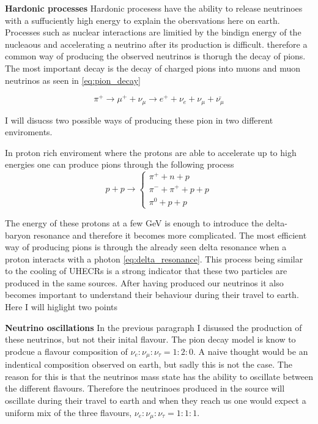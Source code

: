 \documentclass{article}
\begin{document}
\textbf{Hardonic processes}
Hardonic procesess have the ability to release neutrinoes with a suffuciently high energy to explain the obersvations here on earth. 
Processes such as nuclear interactions are limitied by the bindign energy of the nucleaous and accelerating a neutrino after its production is difficult.
therefore a common way of producing the observed neutrinos is thorugh the decay of pions. The most important decay is the decay of charged pions into muons and muon neutrinos as seen in \ref{eq:pion_decay}


\begin{equation}
    \pi^+ \rightarrow \mu^+ + \nu_\mu \rightarrow e^+ + \nu_e + \nu_\mu + \bar{\nu_\mu}
    \label{eq:pion_decay}
\end{equation}

I will disucss two possible ways of producing these pion in two different enviroments. 


In proton rich enviroment where the protons are able to accelerate up to high energies one can produce pions through the following process
\begin{equation}
    p + p \rightarrow \begin{cases}
        \pi^+ + n+ p \\
        \pi^- + \pi^+ +p + p  \\
        \pi^0 + p+p
    \end{cases}
\end{equation}

The energy of these protons at a few GeV is enough to introduce the delta-baryon resonance and therefore it becomes more complicated.
The most efficient way of producing pions is through the already seen delta resonance when a proton interacts with a photon \ref{eq:delta_resonance}.
This process being similar to the cooling of UHECRs is a strong indicator that these two particles are produced in the same sources. 
After having produced our neutrinos it also becomes important to understand their behaviour during their travel to earth. Here I will higlight two points


\textbf{Neutrino oscillations}
In the previous paragraph I disussed the production of these neutrinos, but not their inital flavour.
The pion decay model is know to prodcue a flavour composition of $\nu_e : \nu_\mu : \nu_\tau = 1:2:0$. 
A naive thought would be an indentical composition observed on earth, but sadly this is not the case. 
The reason for this is that the neutrinos mass state has the ability to oscillate between the different flavours. Therefore the neutrinoes produced in the source will oscillate during their travel to earth and when they reach us one would expect a 
uniform mix of the three flavours, $\nu_e : \nu_\mu : \nu_\tau = 1:1:1$.
\end{document}
